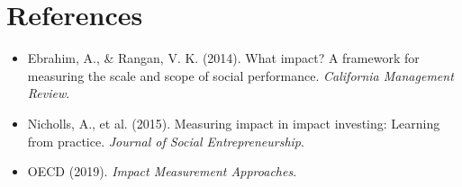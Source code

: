 \documentclass[a4paper,12pt]{article}
\begin{document}
\section*{References}
\begin{itemize}
    \item Ebrahim, A., \& Rangan, V. K. (2014). What impact? A framework for measuring the scale and scope of social performance. \textit{California Management Review}.
    \item Nicholls, A., et al. (2015). Measuring impact in impact investing: Learning from practice. \textit{Journal of Social Entrepreneurship}.
    \item OECD (2019). \textit{Impact Measurement Approaches}.
\end{itemize}
\end{document}
